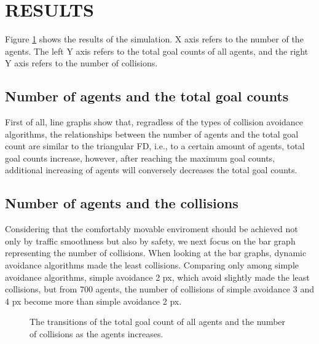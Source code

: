 \documentclass[letterpaper, 10 pt, conference]{ieeeconf}  %
\begin{document}
\section{RESULTS} 
Figure \ref{fig:result1} shows the results of the simulation. X axis refers to the number of the agents. The left Y axis refers to the total goal counts of all agents, and the right Y axis refers to the number of collisions.  

\subsection{Number of agents and the total goal counts}
First of all, line graphs show that, regradless of the types of collision avoidance algorithms, the relationships between the number of agents and the total goal count are similar to the triangular FD, i.e., to a certain amount of agents, total goal counts increase, however, after reaching the maximum goal counts, additional increasing of agents will conversely decreases the total goal counts. 

\subsection{Number of agents and the collisions}
Considering that the comfortably movable enviroment should be achieved not only by traffic smoothness but also by safety, we next focus on the bar graph representing the number of collisions. When looking at the bar graphs, dynamic avoidance algorithms made the least collisions. Comparing only among simple avoidance algorithms, simple avoidance 2 px, which avoid slightly made the least collisions, but from 700 agents, the number of collisions of simple avoidance 3 and 4 px become more than simple avoidance 2 px.

\begin{figure}[thpb]
   \centering
   \caption{The transitions of the total goal count of all agents and the number of collisions as the agents increases.}
   \label{fig:result1}
\end{figure}
\end{document}
